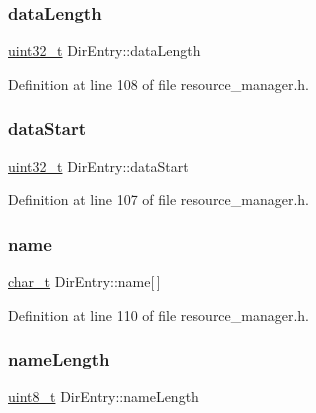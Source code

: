 \subsubsection{\texorpdfstring{data\+Length}{dataLength}}
{\footnotesize\ttfamily \hyperlink{stdint_8h_a435d1572bf3f880d55459d9805097f62}{uint32\+\_\+t} Dir\+Entry\+::data\+Length}



Definition at line 108 of file resource\+\_\+manager.\+h.

\mbox{\label{structDirEntry_aedadd10204139bc3a865f544a871f480}} 
\subsubsection{\texorpdfstring{data\+Start}{dataStart}}
{\footnotesize\ttfamily \hyperlink{stdint_8h_a435d1572bf3f880d55459d9805097f62}{uint32\+\_\+t} Dir\+Entry\+::data\+Start}



Definition at line 107 of file resource\+\_\+manager.\+h.

\mbox{\label{structDirEntry_abc5f015cc534f080f3f66e02ae2fb453}} 
\subsubsection{\texorpdfstring{name}{name}}
{\footnotesize\ttfamily \hyperlink{compiler__port_8h_a40bb5262bf908c328fbcfbe5d29d0201}{char\+\_\+t} Dir\+Entry\+::name\mbox{[}$\,$\mbox{]}}



Definition at line 110 of file resource\+\_\+manager.\+h.

\mbox{\label{structDirEntry_a98d2a3c2a7b3b52b71682ded82f11333}} 
\subsubsection{\texorpdfstring{name\+Length}{nameLength}}
{\footnotesize\ttfamily \hyperlink{stdint_8h_aba7bc1797add20fe3efdf37ced1182c5}{uint8\+\_\+t} Dir\+Entry\+::name\+Length}




